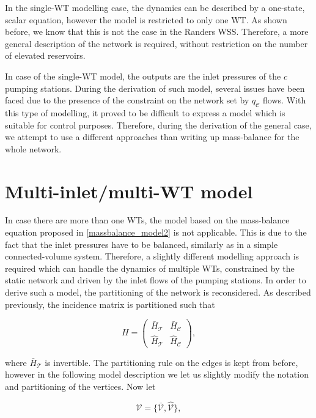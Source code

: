 In the single-WT modelling case, the dynamics can be described by a one-state, scalar equation, however the model is restricted to only one WT. As shown before, we know that this is not the case in the Randers WSS. Therefore, a more general description of the network is required, without restriction on the number of elevated reservoirs. 

In case of the single-WT model, the outputs are the inlet pressures of the $c$ pumping stations. During the derivation of such model, several issues have been faced due to the presence of the constraint on the network set by $q_{\mathcal{C}}$ flows. With this type of modelling, it proved to be difficult to express a model which is suitable for control purposes. Therefore, during the derivation of the general case, we attempt to use a different approaches than writing up mass-balance for the whole network.  

\section{Multi-inlet/multi-WT model}
\label{multi_inlet_multi_WT_model}

In case there are more than one WTs, the model based on the mass-balance equation proposed in \eqref{massbalance_model2} is not applicable. This is due to the fact that the inlet pressures have to be balanced, similarly as in a simple connected-volume system. Therefore, a slightly different modelling approach is required which can handle the dynamics of multiple WTs, constrained by the static network and driven by the inlet flows of the pumping stations. In order to derive such a model, the partitioning of the network is reconsidered. As described previously, the incidence matrix is partitioned such that 

\begin{equation}
\label{H_matrix_sub1}
H=
\begin{pmatrix}
\bar{H}_{\mathcal{T}} & \bar{H}_{\mathcal{C}} \\[3pt]
\hat{H}_{\mathcal{T}} & \hat{H}_{\mathcal{C}}
\end{pmatrix},
\end{equation}

where $\bar{H}_{\mathcal{T}}$ is invertible. The partitioning rule on the edges is kept from before, however in the following model description we let us slightly modify the notation and partitioning of the vertices. Now let

\begin{equation}
  \label{vertices1_1}
  \mathcal{V} = \{\bar{\mathcal{V}}, \hat{\mathcal{V}} \}, 
\end{equation}

